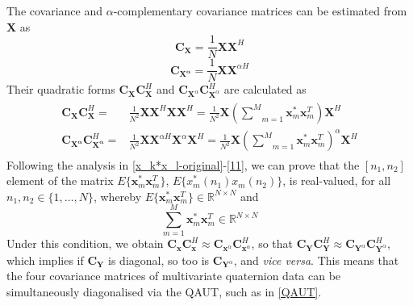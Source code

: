 \documentclass[review]{elsarticle}
\theoremstyle{plain}
\theoremstyle{remark}
\theoremstyle{plain}
\theoremstyle{definition}
\theoremstyle{prop}
\theoremstyle{definition}
\theoremstyle{plain}
\theoremstyle{plain}
\def \X {\mathbf{X}}
\begin{document}
The covariance and $\alpha$-complementary covariance matrices can be estimated from $\X$ as 
\begin{equation}\label{covariance-1}
\mathbf{C}_\mathbf{X}=\frac{1}{N}\mathbf{X}\mathbf{X}^{H}
\end{equation}
\begin{equation}\label{complementary covariance-1}
\mathbf{C}_\mathbf{X^\alpha}=\frac{1}{N}\mathbf{X}\mathbf{X}^{\alpha H}
\end{equation}
Their quadratic forms $\mathbf{C}_{\mathbf{X}}\mathbf{C}_{\mathbf{X}}^H$ and $\mathbf{C}_{\mathbf{X}^\alpha}\mathbf{C}_{\mathbf{X}^\alpha}^H$ are calculated as
\begin{align*}
\begin{array}{rl}
\mathbf{C}_\mathbf{X}\mathbf{C}_\mathbf{X}^{H}=&\!\!\frac{1}{N^2}\mathbf{X}\mathbf{X}^{H}\mathbf{X}\mathbf{X}^{H}=\frac{1}{N^2}\mathbf{X}(\underset{m=1}{\overset{M}{\sum}}\mathbf{x}_{m}^{*}\mathbf{x}_{m}^T)\mathbf{X}^{H}\\
\mathbf{C}_\mathbf{X^\alpha}\mathbf{C}_\mathbf{X^\alpha}^{H}=&\!\!\frac{1}{N^2}\mathbf{X}\mathbf{X}^{\alpha H}\mathbf{X}^{\alpha}\mathbf{X}^{H}=\frac{1}{N^2}\mathbf{X}(\underset{m=1}{\overset{M}{\sum}}\mathbf{x}_{m}^{*}\mathbf{x}_{m}^T)^\alpha\mathbf{X}^{H}
\end{array}
\end{align*}
Following the analysis in \eqref{x_k*x_l-original}-\eqref{11}, we can prove that the $[n_1,n_2]$ element of the matrix $E\{\mathbf{x}_m^{*}\mathbf{x}_m^T\}$, $E\{x_{m}^{*}(n_1)x_{m} (n_2)\}$, is real-valued, for all $n_1,n_2 \in \{1,\ldots,N\}$, whereby $E\{\mathbf{x}_m^{*}\mathbf{x}_m^T\}\in \mathbb{R}^{N\times N}$ and  
\begin{equation*}
\underset{m=1}{\overset{M}{\sum}}\!\mathbf{x}_{m}^{*}\mathbf{x}^T_{m}\in \mathbb{R}^{N\times N}
\end{equation*}
Under this condition, we obtain $\mathbf{C}_{\mathbf{x}}\mathbf{C}_{\mathbf{x}}^H\approx\mathbf{C}_{\mathbf{x}^\alpha}\mathbf{C}_{\mathbf{x}^\alpha}^H$, so that $\mathbf{C}_{\mathbf{Y}}\mathbf{C}_{\mathbf{Y}}^H\approx\mathbf{C}_{\mathbf{Y}^\alpha}\mathbf{C}_{\mathbf{Y}^\alpha}^H$, which implies if $\mathbf{C}_{\mathbf{Y}}$ is diagonal, so too is $\mathbf{C}_{\mathbf{Y}^\alpha}$, and \emph{vice versa}. This means that the four covariance matrices of multivariate quaternion data can be simultaneously diagonalised via the QAUT, such as in \eqref{QAUT}.
\end{document}
